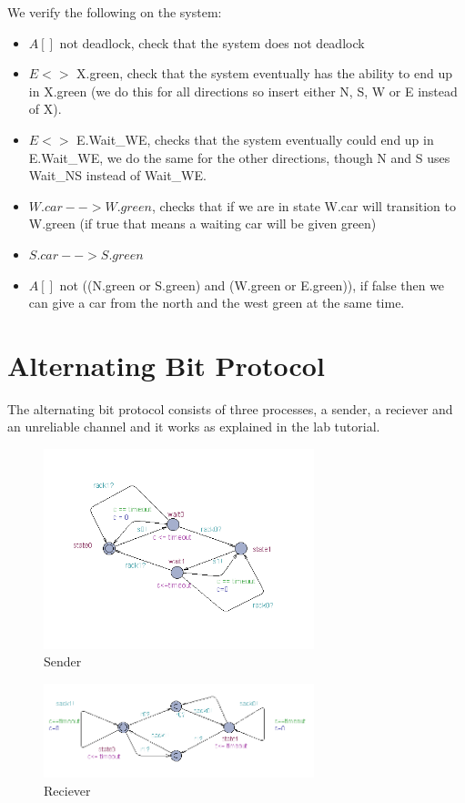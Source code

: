 \documentclass[12pt]{article}
\begin{document}
We verify the following on the system:
\begin{itemize}
\item $A[]$ not deadlock, check that the system does not deadlock
\item $E<>$ X.green, check that the system eventually has the ability to end up in X.green (we do this for all directions so insert either N, S, W or E instead of X).
\item $E<>$ E.Wait\_WE, checks that the system eventually could end up in E.Wait\_WE, we do the same for the other directions, though N and S uses Wait\_NS instead of Wait\_WE.
\item $W.car -->W.green$, checks that if we are in state W.car will transition to W.green (if true that means a waiting car will be given green)
\item $S.car -->S.green$ 
\item $A[]$ not ((N.green or S.green) and (W.green or E.green)), if false then we can give a car from the north and the west green at the same time. 
\end{itemize}
\section{Alternating Bit Protocol}
The alternating bit protocol consists of three processes, a sender, a reciever and an unreliable channel and it works as explained in the lab tutorial. 

\begin{figure}[h!]
  \centering
  \includegraphics[width=0.7\textwidth]{sender.png}
  \caption{Sender}
  \label{fig:s}
\end{figure}

\begin{figure}[h!]
  \centering
  \includegraphics[width=0.7\textwidth]{reciever.png}
  \caption{Reciever}
  \label{fig:r}
\end{figure}
\end{document}
